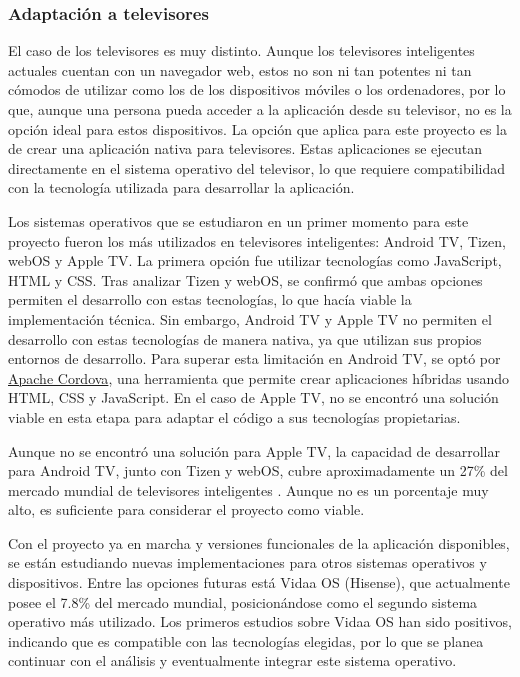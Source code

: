 \subsubsection{Adaptación a televisores}
\label{subsubsec:analisis_estudio_viabilidad_tecnica_aplicacion_tv}

El caso de los televisores es muy distinto. Aunque los televisores inteligentes actuales cuentan con un navegador
web, estos no son ni tan potentes ni tan cómodos de utilizar como los de los dispositivos móviles o los ordenadores, 
por lo que, aunque una persona pueda acceder a la aplicación desde su televisor, no es la opción ideal para 
estos dispositivos. La opción que aplica para este proyecto es la de crear una aplicación nativa para televisores.
Estas aplicaciones se ejecutan directamente en el sistema operativo del televisor, lo que requiere compatibilidad
con la tecnología utilizada para desarrollar la aplicación.

Los sistemas operativos que se estudiaron en un primer momento para este proyecto fueron los más utilizados en 
televisores inteligentes: Android TV, Tizen, webOS y Apple TV. La primera opción fue utilizar tecnologías como 
JavaScript, HTML y CSS. Tras analizar Tizen y webOS, se confirmó que ambas opciones permiten el desarrollo con 
estas tecnologías, lo que hacía viable la implementación técnica. Sin embargo, Android TV y Apple TV no permiten 
el desarrollo con estas tecnologías de manera nativa, ya que utilizan sus propios entornos de desarrollo. Para 
superar esta limitación en Android TV, se optó por \href{https://cordova.apache.org/}{Apache Cordova}, una 
herramienta que permite crear aplicaciones híbridas usando HTML, CSS y JavaScript. En el caso de Apple TV, no se 
encontró una solución viable en esta etapa para adaptar el código a sus tecnologías propietarias.

Aunque no se encontró una solución para Apple TV, la capacidad de desarrollar para Android TV, junto con Tizen 
y webOS, cubre aproximadamente un 27\% del mercado mundial de televisores inteligentes \cite{smarttv_marketshare}. 
Aunque no es un porcentaje muy alto, es suficiente para considerar el proyecto como viable.

Con el proyecto ya en marcha y versiones funcionales de la aplicación disponibles, se están estudiando nuevas 
implementaciones para otros sistemas operativos y dispositivos. Entre las opciones futuras está Vidaa OS 
(Hisense), que actualmente posee el 7.8\% del mercado mundial, posicionándose como el segundo sistema operativo 
más utilizado. Los primeros estudios sobre Vidaa OS han sido positivos, indicando que es compatible con las 
tecnologías elegidas, por lo que se planea continuar con el análisis y eventualmente integrar este sistema operativo.

